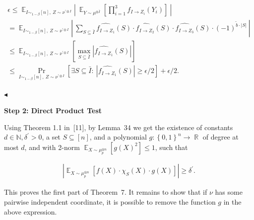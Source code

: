 \documentclass[10pt,a4paper]{article}
\begin{document}
\[\begin{gathered}
\displaystyle\epsilon \displaystyle\leqslant\mathop{\mathbb{E}}_{I\sim_{1-\beta}[n],\ Z\sim\nu^{\prime\otimes I}}\left|\ \mathop{\mathbb{E}}_{Y\sim\mu^{\otimes\bar{I}}}\left[\prod_{i=1}^{3}f_{I\to Z_{i}}(Y_{i})\right]\ \right| \\
\displaystyle=\mathop{\mathbb{E}}_{I\sim_{1-\beta}[n],\ Z\sim\nu^{\prime\otimes I}}\left|\ \sum_{S\subseteq\bar{I}}\widehat{f_{I\to Z_{1}}}(S)\cdot\widehat{f_{I\to Z_{2}}}(S)\cdot\widehat{f_{I\to Z_{3}}}(S)\cdot(-1)^{\tilde{b}\cdot\left|S\right|}\ \right| \\
\displaystyle\leqslant\mathop{\mathbb{E}}_{I\sim_{1-\beta}[n],\ Z\sim\nu^{\prime\otimes I}}\left[\max_{S\subseteq\bar{I}}\left|\widehat{f_{I\to Z_{1}}}(S)\right|\right] \\
\displaystyle\leqslant\Pr_{I\sim_{1-\beta}[n],\ Z\sim\nu^{\prime\otimes I}}\left[\exists S\subseteq\bar{I}:\ \left|\widehat{f_{I\to Z_{1}}}(S)\right|\geqslant\epsilon/2\right]+\epsilon/2.\
\end{gathered}\]


$\blacktriangleleft$\par






\par\medskip\noindent\textbf{Step 2: Direct Product Test}\par




Using Theorem 1.1 in [11], by Lemma 34 we get the existence of constants $d\in\mathbb{N},\delta^{\prime}>0$, a set $S\subseteq[n]$, and a polynomial $g:\left\{0,1\right\}^{n}\to\mathop{\mathbb{R}}$ of degree at most $d$, and with 2-norm $\mathop{\mathbb{E}}_{X\sim\mu_{p}^{\otimes n}}\left[g(X)^{2}\right]\leqslant 1$, such that\par


\[\begin{gathered}
\left|\mathop{\mathbb{E}}_{X\sim\mu_{p}^{\otimes n}}\left[f(X)\cdot\chi_{S}(X)\cdot g(X)\right]\right|\geqslant\delta^{\prime}.
\end{gathered}\]




This proves the first part of Theorem 7.
It remains to show that if $\nu$ has some pairwise independent coordinate, it is possible to remove the function $g$ in the above expression.\par
\end{document}
